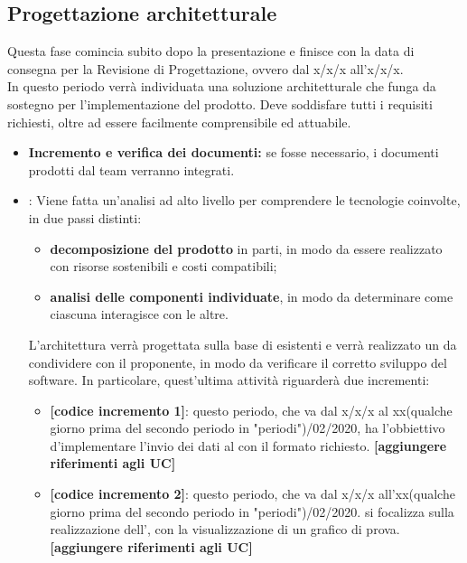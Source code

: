 \subsection{Progettazione architetturale}
Questa fase comincia subito dopo la presentazione e finisce con la data di consegna per la Revisione di Progettazione, ovvero dal x/x/x all'x/x/x.\\
In questo periodo verrà individuata una soluzione architetturale che funga da sostegno per l'implementazione del prodotto. Deve soddisfare tutti i requisiti richiesti, oltre ad essere facilmente comprensibile ed attuabile. 
\begin{itemize}
\item \textbf{Incremento e verifica dei documenti:} se fosse necessario, i documenti prodotti dal team verranno integrati.

 \item {}: Viene fatta un'analisi ad alto livello per comprendere le tecnologie coinvolte, in due passi distinti:
\begin{itemize}
 \item \textbf{decomposizione del prodotto} in parti, in modo da essere realizzato con risorse sostenibili e costi compatibili;
 \item \textbf{analisi delle componenti individuate}, in modo da determinare come ciascuna interagisce con le altre.  
\end{itemize}
L'architettura verrà progettata sulla base di  esistenti e verrà realizzato un  da condividere con il proponente, in modo da verificare il corretto sviluppo del software. In particolare, quest'ultima attività riguarderà due incrementi:
\begin{itemize}
	\item \textbf{[codice incremento 1]}: questo periodo, che va dal x/x/x al xx(qualche giorno prima del secondo periodo in "periodi")/02/2020, ha l'obbiettivo d'implementare l'invio dei dati al  con il formato richiesto. \textbf{[aggiungere riferimenti agli UC]}
	\item \textbf{[codice incremento 2]}: questo periodo, che va dal x/x/x all'xx(qualche giorno prima del secondo periodo in "periodi")/02/2020. si focalizza   sulla realizzazione dell', con la visualizzazione di un grafico di prova. \textbf{[aggiungere riferimenti agli UC]}
\end{itemize} 

\end{itemize}

